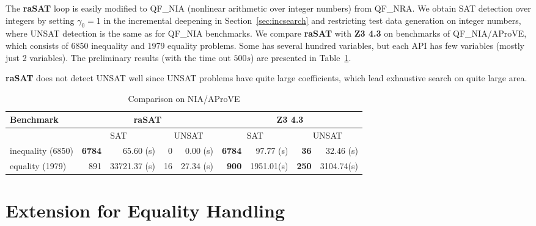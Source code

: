 \documentclass[runningheads,a4paper,oribibl]{llncs}
\newcommand{\suppress}[1]{} %
\begin{document}
The {\bf raSAT} loop is easily modified to QF\_NIA (nonlinear arithmetic over
integer numbers) from QF\_NRA.
We obtain SAT detection over integers by setting $\gamma_0 = 1$ in
the incremental deepening in Section~\ref{sec:incsearch} 
and restricting test data generation on integer numbers,
where UNSAT detection is the same as for QF\_NIA benchmarks. 
We compare {\bf raSAT} with {\bf Z3 4.3} on benchmarks of QF\_NIA/AProVE, 
which consists of 6850 inequality and 1979 equality problems. 
Some has several hundred variables, but each API has few variables
(mostly just 2 variables).
The preliminary results (with the time out $500s$) are presented in
Table~\ref{tab:aprove}. 
\suppress{
\begin{itemize}
\item {\bf raSAT} detects 6773 SAT in 90.22s, and 2 UNSAT in 378.04s. 
\item {\bf Z3 4.3} detects 6784 SAT in 97.70s, and 36 UNSAT in 32.08s. 
\end{itemize}
where the timeout is $500s$. 
}
{\bf raSAT} does not detect UNSAT well since UNSAT problems
have quite large coefficients, which lead exhaustive search on quite large area.
\begin{table}[ht]
\centering
\begin{tabular}{ | l | r | r | r | r  | r | r | r | r |}
\hline
    \multicolumn{1}{|l|}{Benchmark} & 
    \multicolumn{4}{c|}{\bf raSAT} & \multicolumn{4}{c|}{\bf Z3 4.3}\\
\hline
    & \multicolumn{2}{c}{SAT} & \multicolumn{2}{|c}{UNSAT} 
    & \multicolumn{2}{|c}{SAT} & \multicolumn{2}{|c|}{UNSAT} \\
\hline
inequality (6850) & \textbf{6784} & 65.60 (s) & 0 & 0.00 (s) &
\textbf{6784} & 97.77 (s) & \textbf{36} & 32.46 (s) 
\\
\hline
equality (1979) & 891 & 33721.37 (s) & 16 & 27.34 (s) &
\textbf{900} & 1951.01(s) & \textbf{250} & 3104.74(s) 
\\
\hline
\end{tabular}
\medskip 
\caption{Comparison on NIA/AProVE} \label{tab:aprove}
\end{table}
\vspace{-1cm}


\section{Extension for Equality Handling} \label{sec:eq}
\end{document}
